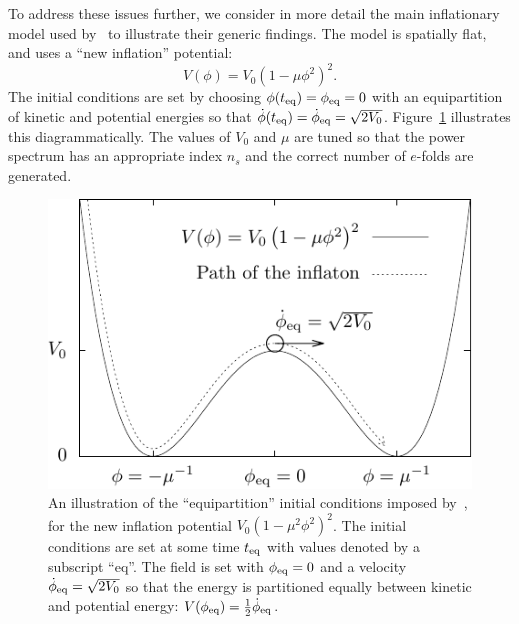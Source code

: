 To address these issues further, we consider in more detail the main inflationary model used by~\cite{boyanovsky_cmb_2006} to illustrate their generic findings.  The model is spatially flat, and uses a ``new inflation'' potential:
%
\begin{equation}
  V(\phi) =V_0{\left(1-\mu\phi^2\right)}^2.
\end{equation}
%
The initial conditions are set by choosing \(\phi(t_{\mathrm{eq}})=\phi_{\mathrm{eq}}=0\) with an equipartition of kinetic and potential energies so that \(\dot{\phi}(t_{\mathrm{eq}})=\dot{\phi}_{\mathrm{eq}}=\sqrt{2V_0}\).  Figure~\ref{fig:figure_BVS_initial_conditions} illustrates this diagrammatically.  The values of \(V_0\) and \(\mu\) are tuned so that the power spectrum has an appropriate index \(n_s\) and the correct number of \(e\)-folds are generated.

%
\begin{figure}[tp]
  \includegraphics[width=\textwidth]{chapters/kinetic_dominance/figures/newpot}
  \caption{An illustration of the ``equipartition'' initial conditions imposed by~\protect\cite{boyanovsky_cmb_2006}, for the new inflation potential \(V_0{\left(1-\mu^2\phi^2\right)}^2\). The initial conditions are set at some time \(t_{\mathrm{eq}}\) with values denoted by a subscript ``eq''. The field is set with \(\phi_{\mathrm{eq}}=0\) and a velocity \(\dot{\phi}_{\mathrm{eq}}= \sqrt{2V_0}\) so that the energy is partitioned equally between kinetic and potential energy: \(V(\phi_{\mathrm{eq}}) = \frac{1}{2}\dot{\phi}_{\mathrm{eq}}\).}\label{fig:figure_BVS_initial_conditions}
\end{figure}
%

